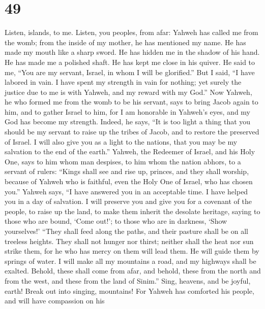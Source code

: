 \hypertarget{section-45}{%
\section{49}\label{section-45}}

 Listen, islands, to me. Listen, you peoples, from afar:
Yahweh has called me from the womb; from the inside of my mother, he has
mentioned my name.  He has made my mouth like a sharp sword.
He has hidden me in the shadow of his hand. He has made me a polished
shaft. He has kept me close in his quiver.  He said to me,
``You are my servant, Israel, in whom I will be glorified.''
 But I said, ``I have labored in vain. I have spent my
strength in vain for nothing; yet surely the justice due to me is with
Yahweh, and my reward with my God.''  Now Yahweh, he who
formed me from the womb to be his servant, says to bring Jacob again to
him, and to gather Israel to him, for I am honorable in Yahweh's eyes,
and my God has become my strength.  Indeed, he says, ``It is
too light a thing that you should be my servant to raise up the tribes
of Jacob, and to restore the preserved of Israel. I will also give you
as a light to the nations, that you may be my salvation to the end of
the earth.''  Yahweh, the Redeemer of Israel, and his Holy
One, says to him whom man despises, to him whom the nation abhors, to a
servant of rulers: ``Kings shall see and rise up, princes, and they
shall worship, because of Yahweh who is faithful, even the Holy One of
Israel, who has chosen you.''  Yahweh says, ``I have
answered you in an acceptable time. I have helped you in a day of
salvation. I will preserve you and give you for a covenant of the
people, to raise up the land, to make them inherit the desolate
heritage,  saying to those who are bound, `Come out!'; to
those who are in darkness, `Show yourselves!' ``They shall feed along
the paths, and their pasture shall be on all treeless heights.
 They shall not hunger nor thirst; neither shall the heat
nor sun strike them, for he who has mercy on them will lead them. He
will guide them by springs of water.  I will make all my
mountains a road, and my highways shall be exalted. 
Behold, these shall come from afar, and behold, these from the north and
from the west, and these from the land of Sinim.''  Sing,
heavens, and be joyful, earth! Break out into singing, mountains! For
Yahweh has comforted his people, and will have compassion on his
